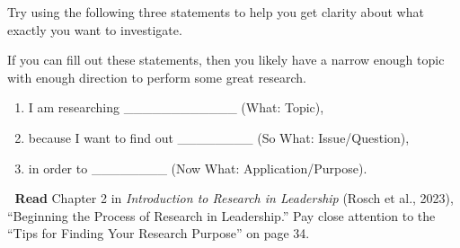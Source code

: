 \documentclass[
  letterpaper,
  DIV=11,
  numbers=noendperiod]{scrreprt}
\providecommand{\tightlist}{%
  \setlength{\itemsep}{0pt}\setlength{\parskip}{0pt}}\usepackage{longtable,booktabs,array}
\begin{document}
Try using the following three statements to help you get clarity about
what exactly you want to investigate.

If you can fill out these statements, then you likely have a narrow
enough topic with enough direction to perform some great research.

\begin{enumerate}
\def\labelenumi{\arabic{enumi}.}
\tightlist
\item
  I am researching \_\_\_\_\_\_\_\_\_\_\_\_ (What: Topic),
\item
  because I want to find out \_\_\_\_\_\_\_\_ (So What: Issue/Question),
\item
  in order to \_\_\_\_\_\_\_\_ (Now What: Application/Purpose).
\end{enumerate}

📖 \textbf{Read} Chapter 2 in \emph{Introduction to Research in
Leadership} (Rosch et al., 2023), ``Beginning the Process of Research in
Leadership.'' Pay close attention to the ``Tips for Finding Your
Research Purpose'' on page 34.
\end{document}
